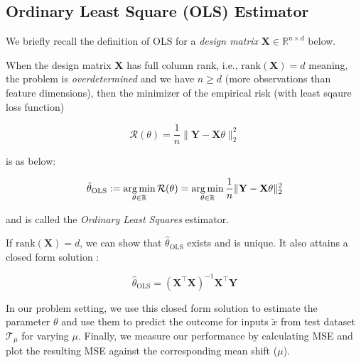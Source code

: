 \subsection{Ordinary Least Square (OLS) Estimator}

We briefly recall the definition of OLS for a \emph{design matrix} $\mathbf{X} \in \mathbb{R}^{n \times d}$ below.

\begin{definition}
When the design matrix $\mathbf{X}$ has full column rank, i.e., $\text{rank}(\mathbf{X}) = d$ meaning, the problem is \emph{overdetermined} and we have $n \geq d$ (more observations than feature dimensions), then the minimizer of the empirical risk (with least sqaure loss function)

\begin{equation}
    \mathcal{R}(\theta) = \frac{1}{n} \lVert \mathbf{Y} - \mathbf{X}\theta \rVert_2^2
    \label{eqn:6.3}
\end{equation}

is as below:

\begin{equation}
    \hat{\theta}_{\text{OLS}} := \operatorname*{arg\,min}_{\theta \in \mathbb{R}} \mathcal{R}(\theta) = \operatorname*{arg\,min}_{\theta \in \mathbb{R}} \frac{1}{n} \lVert \mathbf{Y} - \mathbf{X}\theta \rVert_2^2
    \label{eqn:6.4}
\end{equation}

and is called the \emph{Ordinary Least Squares} estimator.
\end{definition}

\begin{proposition}
If $\text{rank}(\mathbf{X}) = d$, we can show that $\hat{\theta}_{\text{OLS}}$ exists and is unique. It also attains a closed form solution \citep{aitken1936least, rao1945information}:

\begin{equation}
    \hat{\theta}_{\text{OLS}} = (\mathbf{X}^\top \mathbf{X})^{-1}\mathbf{X}^\top \mathbf{Y}
    \label{eqn:6.5}
\end{equation}
\end{proposition}

In our problem setting, we use this closed form solution to estimate the parameter $\theta$ and use them to predict the outcome for inputs $\tilde{x}$ from test dataset $\mathcal{T}_{\mu}$ for varying $\mu$. Finally, we measure our performance by calculating MSE and plot the resulting MSE against the corresponding mean shift ($\mu$).

